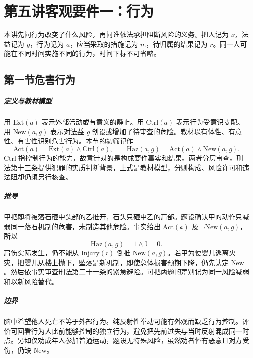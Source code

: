 \chapter{第五讲\quad 客观要件一：行为}
\label{lecture:05}
\par

本讲先问行为改变了什么风险，再问谁依法承担阻断风险的义务。把人记为 $x$，法益记为 $g$，行为记为 $a$，应当采取的措施记为 $m$，待归属的结果记为 $r$。同一人可能在不同时间实施不同的行为，时间下标不可省略。

\section{第一节\quad 危害行为}

\paragraph{定义与教材模型}
用 $\mathrm{Ext}(a)$ 表示外部活动或有意义的静止。用 $\mathrm{Ctrl}(a)$ 表示行为受意识支配。用 $\mathrm{New}(a,g)$ 表示对法益 $g$ 创设或增加了待审查的危险。教材以有体性、有意性、有害性识别危害行为。本节的初筛记作
\[
\mathrm{Act}(a)=\mathrm{Ext}(a)\land\mathrm{Ctrl}(a),
\qquad
\mathrm{Haz}(a,g)=\mathrm{Act}(a)\land\mathrm{New}(a,g).
\]
$\mathrm{Ctrl}$ 指控制行为的能力，故意针对的是构成要件事实和结果。两者分层审查。刑法第十三条提供犯罪的实质判断背景，上式是教材模型，分则构成、风险许可和违法阻却仍须另行核查。

\paragraph{推导}
甲把即将被落石砸中头部的乙推开，石头只砸中乙的肩部。题设确认甲的动作只减弱同一落石机制的危害，未制造其他危险。事实给出 $\mathrm{Act}(a)$ 及 $\neg\mathrm{New}(a,g)$，所以
\[
\mathrm{Haz}(a,g)
   =1\land 0=0 .
\]
肩伤实际发生，仍不能从 $\mathrm{Injury}(r)$ 倒推 $\mathrm{New}(a,g)$。若甲为使婴儿逃离火灾，把婴儿从楼上抛下，坠落是新机制，即使总体损害预期下降，仍先认定 $\mathrm{New}$。然后依事实审查刑法第二十一条的紧急避险。可把两题的差别记为同一风险减弱和以新风险替代。

\paragraph{边界}
脑中希望他人死亡不等于外部行为。纯反射性举动可能有外观而缺乏行为控制。评价可回看行为人此前能够控制的独立行为，避免把先前过失与当时反射混成同一时点。另如仅劝成年人参加普通运动，题设无特殊风险，虽然劝者怀有恶意且对方受伤，仍缺 $\mathrm{New}$。

